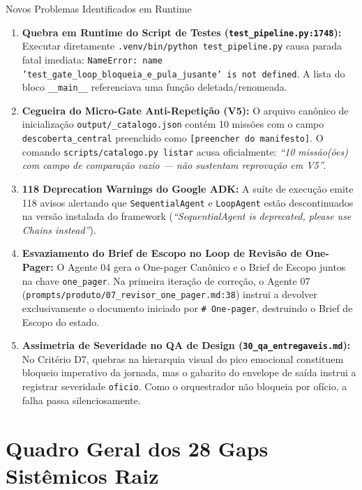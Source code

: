 \documentclass[11pt,a4paper]{article}
\begin{document}
\begin{alertainfra}{Novos Problemas Identificados em Runtime}
\begin{enumerate}[leftmargin=1.2em]
    \item \textbf{Quebra em Runtime do Script de Testes (\texttt{test\_pipeline.py:1748}):} Executar diretamente \texttt{.venv/bin/python test\_pipeline.py} causa parada fatal imediata: \texttt{NameError: name 'test\_gate\_loop\_bloqueia\_e\_pula\_jusante' is not defined}. A lista do bloco \texttt{\_\_main\_\_} referenciava uma função deletada/renomeada.
    \item \textbf{Cegueira do Micro-Gate Anti-Repetição (V5):} O arquivo canônico de inicialização \texttt{output/\_catalogo.json} contém 10 missões com o campo \texttt{descoberta\_central} preenchido como \texttt{[preencher do manifesto]}. O comando \texttt{scripts/catalogo.py listar} acusa oficialmente: \textit{``10 missão(ões) com campo de comparação vazio --- não sustentam reprovação em V5''}.
    \item \textbf{118 Deprecation Warnings do Google ADK:} A suíte de execução emite 118 avisos alertando que \texttt{SequentialAgent} e \texttt{LoopAgent} estão descontinuados na versão instalada do framework (\textit{``SequentialAgent is deprecated, please use Chains instead''}).
    \item \textbf{Esvaziamento do Brief de Escopo no Loop de Revisão de One-Pager:} O Agente 04 gera o One-pager Canônico e o Brief de Escopo juntos na chave \texttt{one\_pager}. Na primeira iteração de correção, o Agente 07 (\texttt{prompts/produto/07\_revisor\_one\_pager.md:38}) instrui a devolver exclusivamente o documento iniciado por \texttt{\# One-pager}, destruindo o Brief de Escopo do estado.
    \item \textbf{Assimetria de Severidade no QA de Design (\texttt{30\_qa\_entregaveis.md}):} No Critério D7, quebras na hierarquia visual do pico emocional constituem bloqueio imperativo da jornada, mas o gabarito do envelope de saída instrui a registrar severidade \texttt{oficio}. Como o orquestrador não bloqueia por ofício, a falha passa silenciosamente.
\end{enumerate}
\end{alertainfra}

\newpage
\section{Quadro Geral dos 28 Gaps Sistêmicos Raiz}
\end{document}
